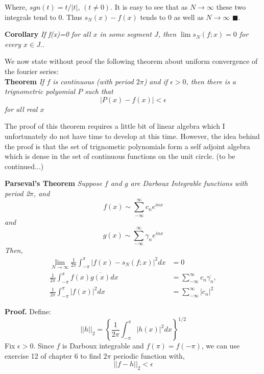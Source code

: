 \documentclass{article}
\begin{document}
Where, $sgn(t)=t/|t|$, $(t\neq0)$.  It is easy to see that as $N\rightarrow \infty$ these two integrals tend to 0.  Thus $s_N(x)-f(x)$ tends to 0 as well as $N\rightarrow \infty$ $\blacksquare$.  

\textbf{Corollary} \emph{If f(x)=0 for all $x$ in some segment $J$, then $\lim s_N(f;x)=0$ for every $x\in J.$. }

We now state without proof the following theorem about uniform convergence of the fourier series:\\

\textbf{Theorem} \emph{If $f$ is continuous (with period $2\pi$) and if $\epsilon >0$, then there is a trignometric polyomial $P$ such that }
\begin{equation}
|P(x)-f(x)|<\epsilon
\end{equation}
\emph{for all real $x$}

The proof of this theorem requires a little bit of linear algebra which I unfortunately do not have time to develop at this time. However, the idea behind the proof is that the set of trignometic polynomials form a self adjoint algebra which is dense in the set of continuous functions on the unit circle. (to be continued...)
 
\textbf{Parseval's Theorem} \emph{Suppose $f$ and $g$ are Darboux Integrable functions with period 2$\pi$, and}
\begin{equation}
f(x)\sim \sum_{-\infty}^{\infty} c_ne^{inx}
\end{equation}
\emph{and}
\begin{equation}
g(x)\sim \sum_{-\infty}^{\infty} \gamma_ne^{inx}
\end{equation}
\emph{Then,}
\begin{align}
\label{one}
\lim_{N\rightarrow \infty} \frac{1}{2\pi} \int_{-\pi}^{\pi}|f(x)-s_N(f;x)|^2dx &=0\\
\label{two}
\frac{1}{2\pi}\int_{-\pi}^{\pi}f(x)\overline{g(x)}dx&=\sum_{-\infty}^{\infty}c_n\overline{\gamma_n},\\
\label{three}
\frac{1}{2\pi}\int_{-\pi}^{\pi}|f(x)|^2dx &=\sum_{-\infty}^{\infty}|c_n|^2
\end{align}

\textbf{Proof.} Define:
\begin{equation}
||h||_2=\left\{\frac{1}{2\pi}\int_{-\pi}^{\pi}|h(x)|^2dx\right\}^{1/2}
\end{equation}
Fix $\epsilon>0$.  Since $f$ is Darboux integrable  and $f(\pi)=f(-\pi)$, we can  use exercise 12 of chapter 6 to find $2\pi$ periodic function with, 
\begin{equation}
||f-h||_2 <\epsilon
\end{equation}
\end{document}
